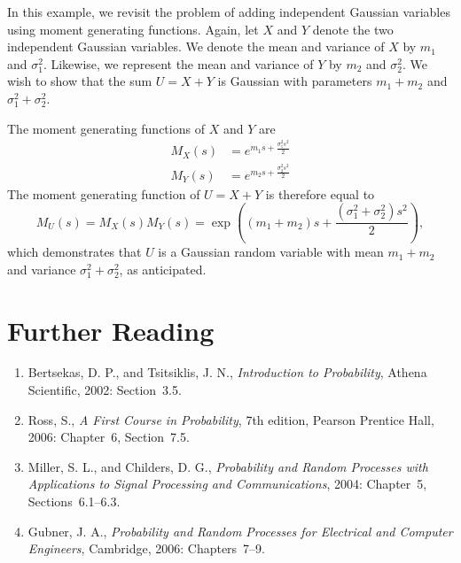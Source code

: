 \begin{example}
In this example, we revisit the problem of adding independent Gaussian variables using moment generating functions.
Again, let $X$ and $Y$ denote the two independent Gaussian variables.
We denote the mean and variance of $X$ by $m_1$ and $\sigma_1^2$.
Likewise, we represent the mean and variance of $Y$ by $m_2$ and $\sigma_2^2$.
We wish to show that the sum $U = X + Y$ is Gaussian with parameters $m_1 + m_2$ and $\sigma_1^2 + \sigma_2^2$.

The moment generating functions of $X$ and $Y$ are
\begin{align*}
M_X (s) &= e^{m_1 s + \frac{\sigma_1^2 s^2}{2}} \\
M_Y (s) &= e^{m_2 s + \frac{\sigma_2^2 s^2}{2}}
\end{align*}
The moment generating function of $U = X + Y$ is therefore equal to
\begin{equation*}
M_U (s) = M_X (s) M_Y (s)
= \exp \left( (m_1 + m_2) s + \frac{(\sigma_1^2 + \sigma_2^2) s^2}{2} \right) ,
\end{equation*}
which demonstrates that $U$ is a Gaussian random variable with mean $m_1 + m_2$ and variance $\sigma_1^2 + \sigma_2^2$, as anticipated.
\end{example}


\section*{Further Reading}

\begin{small}
\begin{enumerate}
\item Bertsekas, D. P., and Tsitsiklis, J. N., \emph{Introduction to Probability}, Athena Scientific, 2002: Section~3.5.
\item Ross, S., \emph{A First Course in Probability}, 7th edition, Pearson Prentice Hall, 2006: Chapter~6, Section~7.5.
\item Miller, S. L., and Childers, D. G., \emph{Probability and Random Processes with Applications to Signal Processing and Communications}, 2004: Chapter~5, Sections~6.1--6.3.
\item Gubner, J. A., \emph{Probability and Random Processes for Electrical and Computer Engineers}, Cambridge, 2006: Chapters~7--9.
\end{enumerate}
\end{small}


